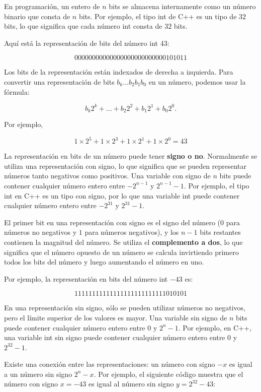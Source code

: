 En programación, un entero de $n$ bits se almacena internamente como un número binario que consta de $n$ bits. Por ejemplo, el tipo int de C++ es un tipo de $32$ bits, lo que significa que cada número int consta de $32$ bits.

Aquí está la representación de bits del número int 43:

$$00000000000000000000000000101011$$

Los bits de la representación están indexados de derecha a izquierda. Para convertir una representación de bits $b_k\dots b_2b_1b_0$ en un número, podemos usar la fórmula:

$$b_k 2^k + \dots + b_2 2^2 + b_1 2^1 + b_0 2^0 .$$

Por ejemplo,

$$1\times2^5 + 1 \times 2^3 + 1 \times 2^1 + 1 \times 2^0 = 43$$

La representación en bits de un número puede tener \textbf{signo o no}. Normalmente se utiliza una representación con signo, lo que significa que se pueden representar números tanto negativos como positivos. Una variable con signo de $n$ bits puede contener cualquier número entero entre $-2^{n-1}$ y $2^{n-1}-1$. Por ejemplo, el tipo int en C++ es un tipo con signo, por lo que una variable int puede contener cualquier número entero entre $-2^{31}$ y $2^{31}-1$.

El primer bit en una representación con signo es el signo del número ($0$ para
números no negativos y $1$ para números negativos), y los $n-1$ bits restantes contienen la magnitud del número. Se utiliza el \textbf{complemento a dos}, lo que significa que el número opuesto de un número se calcula invirtiendo primero todos los bits del número y luego aumentando el número en uno.

Por ejemplo, la representación en bits del número int $-43$ es:

$$11111111111111111111111111010101$$

En una representación sin signo, sólo se pueden utilizar números no negativos, pero el límite superior de los valores es mayor. Una variable sin signo de $n$ bits puede contener cualquier número entero entre $0$ y $2^n-1$. Por ejemplo, en C++, una variable int sin signo puede contener cualquier número entero entre $0$ y $2^{32}-1$.

Existe una conexión entre las representaciones: un número con signo $-x$ es igual a un número sin signo $2^n-x$. Por ejemplo, el siguiente código muestra que el número con signo $x =-43$ es igual al número sin signo $y=2^{32}-43$:

